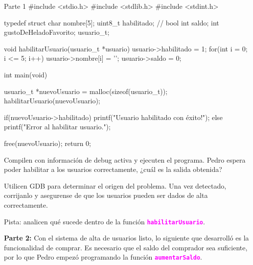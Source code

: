 \documentclass[]{scrartcl}
\newcommand{\hl}[1]{\textcolor{magenta}{\textbf{\texttt{#1}}}}
\begin{document}
\begin{cbox}[]{Parte 1}
  #include <stdio.h>
  #include <stdlib.h>
  #include <stdint.h>

  typedef struct{
      char nombre[5];
      uint8_t habilitado; // bool
      int saldo;
      int gustoDeHeladoFavorito;
  } usuario_t;

  void habilitarUsuario(usuario_t *usuario){
      usuario->habilitado = 1;
      for(int i = 0; i <= 5; i++){
          usuario->nombre[i] = '\0';
      }
      usuario->saldo = 0;
  }

  int main(void){
      usuario_t *nuevoUsuario = malloc(sizeof(usuario_t));
      habilitarUsuario(nuevoUsuario);

      if(nuevoUsuario->habilitado){
          printf("Usuario habilitado con éxito!\n");
      } else{
          printf("Error al habilitar usuario.\n");
      }
    
      free(nuevoUsuario);
      return 0;
  }
\end{cbox}

Compilen con información de debug activa y ejecuten el programa. Pedro espera poder habilitar a los usuarios correctamente, ¿cuál es la salida obtenida?

Utilicen GDB para determinar el origen del problema. Una vez detectado, corrijanlo y asegurense de que los usuarios pueden ser dados de alta correctamente.

Pista: analicen qué sucede dentro de la función \hl{habilitarUsuario}.

\textbf{Parte 2:}
Con el sistema de alta de usuarios listo, lo siguiente que desarrolló es la funcionalidad de comprar. 
Es necesario que el saldo del comprador sea suficiente, por lo que Pedro empezó programando la función \hl{aumentarSaldo}.
\end{document}
